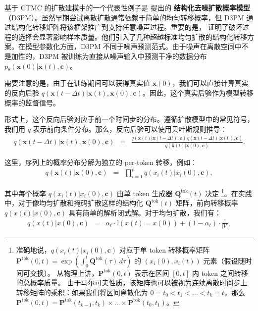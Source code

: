 \documentclass[UTF8,a4paper,zihao=-4,oneside,openany]{ctexbook}
\begin{document}
基于 CTMC 的扩散建模中的一个代表性例子是 \citet{austin-etal:2021structured} 提出的 \textbf{结构化去噪扩散概率模型}（D3PM）。虽然早期尝试离散扩散通常依赖于简单的均匀转移概率，但 D3PM 通过结构化转移矩阵将该框架推广到支持任意噪声过程。重要的是，\citet{austin-etal:2021structured} 证明了破坏过程的选择会显著影响样本质量。他们引入了几种超越标准均匀扩散的结构化转移方案。在模型参数化方面，D3PM 不同于噪声预测范式。由于噪声在离散空间中不是加性的，D3PM 被训练为直接从噪声输入中预测干净的数据分布 $p_\theta(\mathbf{x}(0) | \mathbf{x}(t), \mathbf{c})$。

需要注意的是，由于在训练期间可以获得真实值 $\mathbf{x}(0)$，我们可以直接计算真实的反向后验 $q(\mathbf{x}(t - \Delta t) | \mathbf{x}(t), \mathbf{x}(0), \mathbf{c})$。因此，这个真实后验作为模型转移概率的监督信号。

形式上，这个反向后验对应于前一个时间步的分布。遵循扩散模型中的常见符号，我们用 $q$ 表示前向条件分布。那么，反向后验可以使用贝叶斯规则推导：
\begin{eqnarray}
q(\mathbf{x}(t - \Delta t) | \mathbf{x}(t), \mathbf{x}(0), \mathbf{c}) & = & \frac{q(\mathbf{x}(t) | \mathbf{x}(t - \Delta t), \mathbf{c}) \, q(\mathbf{x}(t - \Delta t) | \mathbf{x}(0), \mathbf{c})}{q(\mathbf{x}(t) | \mathbf{x}(0), \mathbf{c})}.
\end{eqnarray}

\noindent 这里，序列上的概率分布分解为独立的 per-token 转移，例如：
\begin{eqnarray}
q(\mathbf{x}(t)|\mathbf{x}(0), \mathbf{c}) & = & \prod_{i=1}^{n} q(x_i(t)|x_i(0), \mathbf{c}),
\end{eqnarray}

\noindent 其中每个概率 $q(x_i(t)|x_i(0), \mathbf{c})$ 由单 token 生成器 $\mathbf{Q}^{\mathrm{tok}}(t)$ 决定
\footnote{准确地说，$q(x_i(t)|x_i(0), \mathbf{c})$ 对应于单 token 转移概率矩阵
$\mathbf{P}^{\mathrm{tok}}(0,t) = \exp\!\left(\int_0^t \mathbf{Q}^{\mathrm{tok}}(\tau)\, d\tau\right)$ 的 $(x_i(0), x_i(t))$ 元素（假设随时间可交换）。
从物理上讲，$\mathbf{P}^{\mathrm{tok}}(0,t)$ 表示在区间 $[0, t]$ 内 token 之间转移的总概率质量。
由于马尔可夫性质，该矩阵也可以被视为连续离散时间步上转移矩阵的乘积：如果我们将区间离散化为 $0=t_0 < t_1 < \dots < t_k=t$，那么
$\mathbf{P}^{\mathrm{tok}}(0,t) = \mathbf{P}^{\mathrm{tok}}(t_{k-1},t_k)\times\dots\times \mathbf{P}^{\mathrm{tok}}(t_0,t_1)$。}。在实践中，对于像均匀扩散和掩码扩散这样的结构化 $\mathbf{Q}^{\mathrm{tok}}(t)$ 矩阵，前向转移概率 $q(x(t) | x(0), \mathbf{c})$ 具有简单的解析闭式解。对于均匀扩散，我们有：
\begin{eqnarray}
q(x(t) | x(0), \mathbf{c}) & = & \alpha_t \cdot \mathbb{I}(x(t) = x(0)) + (1 - \alpha_t) \cdot \frac{1}{|V|},
\end{eqnarray}
\end{document}
